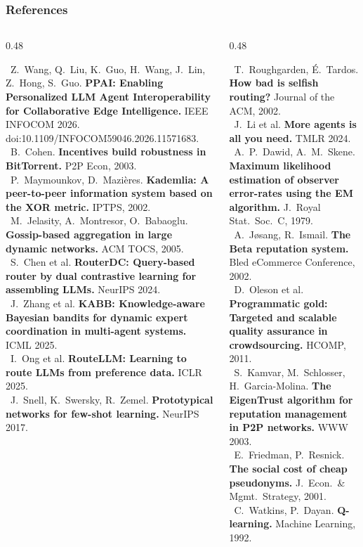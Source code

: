 \documentclass[aspectratio=169,10pt]{beamer}
\newcommand{\bul}{\textbullet~}
\begin{document}
\begin{frame}
\frametitle{References}
\fontsize{6.4}{7.9}\selectfont
\vspace{1mm}
\begin{columns}[T,onlytextwidth]
\begin{column}{0.48\textwidth}
\raggedright
\bul Z.~Wang, Q.~Liu, K.~Guo, H.~Wang, J.~Lin, Z.~Hong, S.~Guo. \textbf{PPAI: Enabling Personalized LLM Agent Interoperability for Collaborative Edge Intelligence.} IEEE INFOCOM 2026. doi:10.1109/INFOCOM59046.2026.11571683.\\[1.1mm]
\bul B.~Cohen. \textbf{Incentives build robustness in BitTorrent.} P2P Econ, 2003.\\[1.1mm]
\bul P.~Maymounkov, D.~Mazi\`eres. \textbf{Kademlia: A peer-to-peer information system based on the XOR metric.} IPTPS, 2002.\\[1.1mm]
\bul M.~Jelasity, A.~Montresor, O.~Babaoglu. \textbf{Gossip-based aggregation in large dynamic networks.} ACM TOCS, 2005.\\[1.1mm]
\bul S.~Chen et al. \textbf{RouterDC: Query-based router by dual contrastive learning for assembling LLMs.} NeurIPS 2024.\\[1.1mm]
\bul J.~Zhang et al. \textbf{KABB: Knowledge-aware Bayesian bandits for dynamic expert coordination in multi-agent systems.} ICML 2025.\\[1.1mm]
\bul I.~Ong et al. \textbf{RouteLLM: Learning to route LLMs from preference data.} ICLR 2025.\\[1.1mm]
\bul J.~Snell, K.~Swersky, R.~Zemel. \textbf{Prototypical networks for few-shot learning.} NeurIPS 2017.
\end{column}
\begin{column}{0.48\textwidth}
\raggedright
\bul T.~Roughgarden, \'E.~Tardos. \textbf{How bad is selfish routing?} Journal of the ACM, 2002.\\[1.1mm]
\bul J.~Li et al. \textbf{More agents is all you need.} TMLR 2024.\\[1.1mm]
\bul A.~P.~Dawid, A.~M.~Skene. \textbf{Maximum likelihood estimation of observer error-rates using the EM algorithm.} J.~Royal Stat.~Soc.~C, 1979.\\[1.1mm]
\bul A.~J{\o}sang, R.~Ismail. \textbf{The Beta reputation system.} Bled eCommerce Conference, 2002.\\[1.1mm]
\bul D.~Oleson et al. \textbf{Programmatic gold: Targeted and scalable quality assurance in crowdsourcing.} HCOMP, 2011.\\[1.1mm]
\bul S.~Kamvar, M.~Schlosser, H.~Garcia-Molina. \textbf{The EigenTrust algorithm for reputation management in P2P networks.} WWW 2003.\\[1.1mm]
\bul E.~Friedman, P.~Resnick. \textbf{The social cost of cheap pseudonyms.} J.~Econ.~\& Mgmt.~Strategy, 2001.\\[1.1mm]
\bul C.~Watkins, P.~Dayan. \textbf{Q-learning.} Machine Learning, 1992.
\end{column}
\end{columns}
\end{frame}
\end{document}
